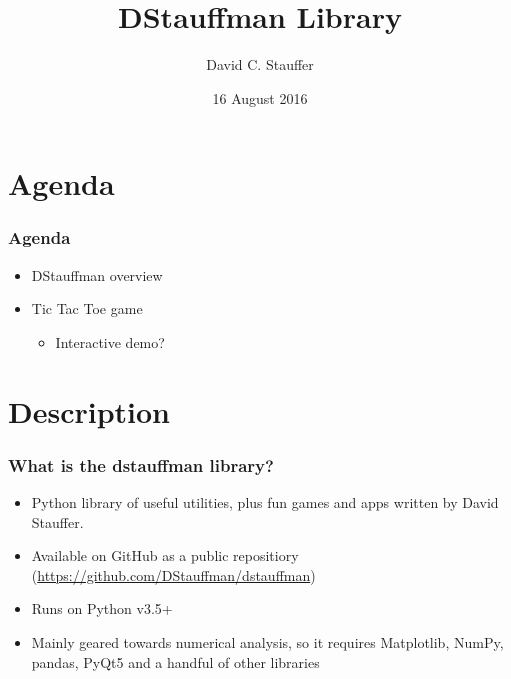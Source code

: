\documentclass{beamer}
\title{DStauffman Library}
\author{David C. Stauffer}
\date{16 August 2016}
\begin{document}
\begin{frame}
\titlepage
\end{frame}

\section{Agenda}
\begin{frame}
    \frametitle{Agenda}
    \begin{itemize}
        \item DStauffman overview
        \item Tic Tac Toe game
        \begin{itemize}
            \item Interactive demo?
        \end{itemize}
    \end{itemize}
\end{frame}


\section{Description}
\begin{frame}
    \frametitle{What is the dstauffman library?}
    \begin{itemize}
        \item Python library of useful utilities, plus fun games and apps written by David Stauffer.
        \item Available on GitHub as a public repositiory (\url{https://github.com/DStauffman/dstauffman})
        \item Runs on Python v3.5+
        \item Mainly geared towards numerical analysis, so it requires Matplotlib, NumPy, pandas, PyQt5 and a handful of other libraries
    \end{itemize}
\end{frame}
\end{document}
